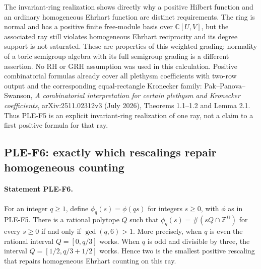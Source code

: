 The invariant-ring realization shows directly why a positive Hilbert
function and an ordinary homogeneous Ehrhart function are distinct
requirements. The ring is normal and has a positive finite free-module
basis over $\mathbb C[U,V]$, but the associated ray still violates
homogeneous Ehrhart reciprocity and its degree support is not saturated.
These are properties of this weighted grading; normality of a toric
semigroup algebra with its full semigroup grading is a different assertion.
No RH or GRH assumption was used in this calculation.
Positive combinatorial formulas already cover all plethysm coefficients
with two-row output and the corresponding equal-rectangle Kronecker family:
Pak--Panova--Swanson, \emph{A combinatorial interpretation for certain
plethysm and Kronecker coefficients}, arXiv:2511.02312v3 (July 2026),
Theorems 1.1--1.2 and Lemma 2.1. Thus PLE-F5 is an explicit invariant-ring
realization of one ray, not a claim to a first positive formula for that ray.

\subsection{PLE-F6: exactly which rescalings repair homogeneous counting}
\paragraph{Statement PLE-F6.}
For an integer $q\ge1$, define
$\phi_q(s)=\phi(qs)$ for integers $s\ge0$, with $\phi$ as in PLE-F5.
There is a rational polytope $Q$ such that
$\phi_q(s)=\#(sQ\cap\mathbb Z^D)$ for every $s\ge0$ if and only if
$\gcd(q,6)>1$. More precisely, when $q$ is even the rational interval
$Q=[0,q/3]$ works. When $q$ is odd and divisible by three, the interval
$Q=[1/2,q/3+1/2]$ works. Hence two is the smallest positive rescaling
that repairs homogeneous Ehrhart counting on this ray.

